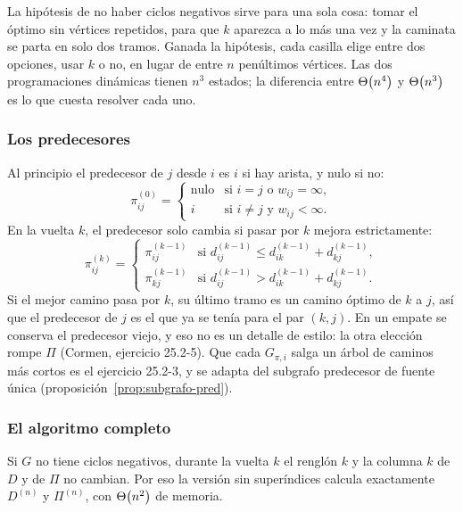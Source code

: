 \documentclass[11pt,letterpaper]{article}
\begin{document}
\begin{idea}
  La hipótesis de no haber ciclos negativos sirve para una sola cosa:
  tomar el óptimo sin vértices repetidos, para que $k$ aparezca a lo
  más una vez y la caminata se parta en solo dos tramos. Ganada la
  hipótesis, cada casilla elige entre dos opciones, usar $k$ o no, en
  lugar de entre $n$ penúltimos vértices. Las dos programaciones
  dinámicas tienen $n^3$ estados; la diferencia entre $\Theta\!\left(n^4\right)$ y
  $\Theta\!\left(n^3\right)$ es lo que cuesta resolver cada uno.
\end{idea}

\subsubsection*{Los predecesores}

Al principio el predecesor de $j$ desde $i$ es $i$ si hay arista, y
nulo si no:
\[
  \pi^{(0)}_{ij} = \begin{cases}
    \text{nulo} & \text{si } i = j \text{ o } w_{ij} = \infty, \\
    i & \text{si } i \neq j \text{ y } w_{ij} < \infty .
  \end{cases}
\]
En la vuelta $k$, el predecesor solo cambia si pasar por $k$ mejora
estrictamente:
\[
  \pi^{(k)}_{ij} = \begin{cases}
    \pi^{(k-1)}_{ij} & \text{si } d^{(k-1)}_{ij} \le
                       d^{(k-1)}_{ik} + d^{(k-1)}_{kj}, \\
    \pi^{(k-1)}_{kj} & \text{si } d^{(k-1)}_{ij} >
                       d^{(k-1)}_{ik} + d^{(k-1)}_{kj}.
  \end{cases}
\]
Si el mejor camino pasa por $k$, su último tramo es un camino óptimo
de $k$ a $j$, así que el predecesor de $j$ es el que ya se tenía para
el par $(k, j)$. En un empate se conserva el predecesor viejo, y eso
no es un detalle de estilo: la otra elección rompe $\Pi$ (Cormen,
ejercicio 25.2-5). Que cada $G_{\pi,i}$ salga un árbol de caminos más
cortos es el ejercicio 25.2-3, y se adapta del subgrafo predecesor de
fuente única (proposición~\ref{prop:subgrafo-pred}).

\subsubsection*{El algoritmo completo}

\begin{proposicion}
  \label{prop:floyd-lugar}
  Si $G$ no tiene ciclos negativos, durante la vuelta $k$ el renglón
  $k$ y la columna $k$ de $D$ y de $\Pi$ no cambian. Por eso la versión
  sin superíndices calcula exactamente $D^{(n)}$ y $\Pi^{(n)}$, con
  $\Theta\!\left(n^2\right)$ de memoria.
\end{proposicion}
\end{document}
